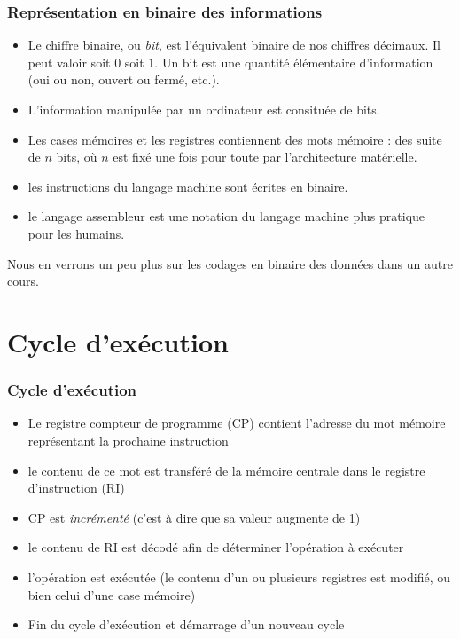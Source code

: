 \documentclass[xcolor=svgnames]{beamer}
\begin{document}
\begin{frame}
  \frametitle{Représentation en binaire des informations}
  \pause
  \begin{definition}[bit]
    \begin{itemize}
    \item Le chiffre binaire, ou \emph{bit}, est l'équivalent binaire
      de nos chiffres décimaux. Il peut valoir soit $0$ soit $1$. Un
      bit est une \alert{quantité élémentaire d'information} (oui ou non,
      ouvert ou fermé, etc.).\pause
    \item L'information manipulée par un ordinateur est consituée de
      bits.\pause
\item Les cases mémoires et les registres contiennent des \alert{mots mémoire}
  : des suite de $n$ bits, où $n$ est fixé une fois pour toute par
  l'architecture matérielle.\pause
\item les instructions du langage machine sont écrites en binaire.\pause
\item   le \alert{langage assembleur} est une notation du langage
  machine plus pratique pour les humains. 
   \end{itemize}
  \end{definition}
\pause Nous en verrons un peu plus sur les codages en binaire des données
dans un autre cours.
\end{frame}

\section{Cycle d'exécution}
\begin{frame}
  \frametitle{Cycle d'exécution}
\pause
\begin{itemize}
  \item Le registre \alert{compteur de programme} (CP) contient l'adresse du mot mémoire
    représentant la prochaine instruction\pause
\item le contenu de ce mot est transféré de la mémoire centrale dans
  le \alert{registre d'instruction} (RI)\pause
\item CP est \emph{incrémenté} (c'est à dire que sa valeur augmente de 1)\pause
\item le contenu de RI est décodé afin de déterminer l'opération à
  exécuter\pause
\item l'opération est exécutée (le contenu d'un ou plusieurs
  registres est modifié, ou bien celui d'une case mémoire)\pause
\item Fin du cycle d'exécution et démarrage d'un nouveau cycle
\end{itemize}
\end{frame}
\end{document}
